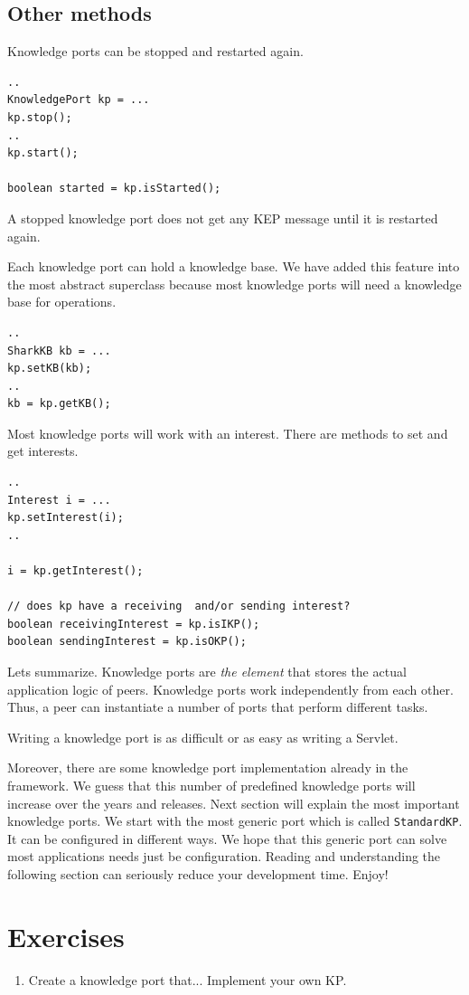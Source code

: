 \subsection{Other methods}
Knowledge ports can be stopped and restarted again.

\begin{verbatim}
..
KnowledgePort kp = ...
kp.stop();
..
kp.start();

boolean started = kp.isStarted();
\end{verbatim}

A stopped knowledge port does not get any KEP message until it is restarted again. 

Each knowledge port can hold a knowledge base. We have added this feature into the most abstract superclass because most knowledge ports will need a knowledge base for operations.

\begin{verbatim}
..
SharkKB kb = ...
kp.setKB(kb);
..
kb = kp.getKB();
\end{verbatim}

Most knowledge ports will work with an interest. There are methods to set and get interests.

\begin{verbatim}
..
Interest i = ...
kp.setInterest(i);
..

i = kp.getInterest();

// does kp have a receiving  and/or sending interest?
boolean receivingInterest = kp.isIKP();
boolean sendingInterest = kp.isOKP();
\end{verbatim}

Lets summarize. Knowledge ports are {\it the element} that stores the actual application logic of peers. Knowledge ports work independently from each other. Thus, a peer can instantiate a number of ports that perform different tasks.

Writing a knowledge port is as difficult or as easy as writing a Servlet. 

Moreover, there are some knowledge port implementation already in the framework. We guess that this number of predefined knowledge ports will increase over the years and releases. Next section will explain the most important knowledge ports. We start with the most generic port which is called {\tt StandardKP}. It can be configured in different ways. We hope that this generic port can solve most applications needs just be configuration. Reading and understanding the following section can seriously reduce your development time. Enjoy!

\section{Exercises}

\begin{enumerate}
\item 
Create a knowledge port that... Implement your own KP.
\end{enumerate}
